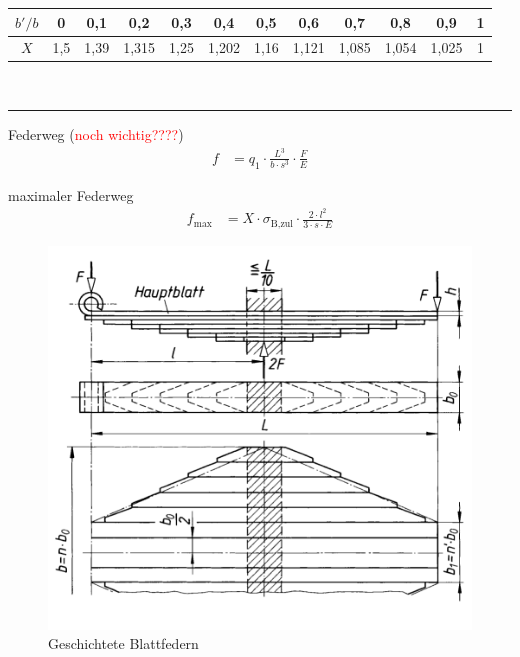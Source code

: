 \begin{tabular}{c|c|c|c|c|c|c|c|c|c|c|c}
	\hline  
 $b'/b$	& 0 & 0,1 & 0,2 & 0,3 & 0,4 & 0,5 & 0,6 & 0,7 & 0,8 & 0,9 & 1 \\ 
	\hline  
 $X$	& 1,5 & 1,39 & 1,315 & 1,25 & 1,202 & 1,16 & 1,121 & 1,085 & 1,054 & 1,025 & 1 \\ 
	\hline 
\end{tabular} 

\\[10pt]
\hrule

\begin{eeqn}{Federweg (\textcolor{red}{noch wichtig????})}
	\begin{align}
		f &= q_1 \cdot \frac{L^3}{b\cdot s^3}\cdot \frac{F}{E}
	\end{align}
\end{eeqn}

\begin{eeqn}{maximaler Federweg}
	\begin{align}
		f_\text{max} &= X \cdot \sigma_\text{B,zul} \cdot \frac{2 \cdot l^2}{3 \cdot s \cdot E}
	\end{align}
\end{eeqn}

\begin{figure}[H]
	\includegraphics[width=\linewidth]{federn/blattfedern-geschichtet}
	\caption*{Geschichtete Blattfedern}
\end{figure}

